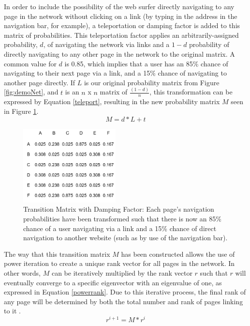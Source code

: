 \documentclass[12pt]{report}   %
\begin{document}
In order to include the possibility of the web surfer directly navigating to any page in the network without clicking on a link (by typing in the address in the navigation bar, for example), a teleportation or damping factor is added to this matrix of probabilities. This teleportation factor applies an arbitrarily-assigned probability, $d$, of navigating the network via links and a $1-d$ probability of directly navigating to any other page in the network to the original matrix. A common value for $d$ is 0.85, which implies that a user has an 85\% chance of navigating to their next page via a link, and a 15\% chance of navigating to another page directly. If $L$ is our original probability matrix from Figure \ref{fig:demoNet}, and $t$ is an $n$ x $n$ matrix of $\frac{(1-d)}{n}$, this transformation can be expressed by Equation \ref{teleport}, resulting in the new probability matrix $M$ seen in Figure \ref{fig:demoDamp}.
\begin{equation}
\label{teleport}
M=d*L+t
\end{equation}

\begin{figure}[h]
    \centering
    \begin{minipage}{0.9\textwidth}
	\captionsetup{font=scriptsize}
        \centering
        \includegraphics[width=0.45\textwidth]{Marbut_DemoWDamping.png} %
        \caption{Transition Matrix with Damping Factor: Each page's navigation probabilities have been transformed such that there is now an 85\% chance of a user navigating via a link and a 15\% chance of direct navigation to another website (such as by use of the navigation bar).}
	  \label{fig:demoDamp}
    \end{minipage}
 \end{figure}
\FloatBarrier 

The way that this transition matrix $M$ has been constructed allows the use of power iteration to create a unique rank vector for all pages in the network. In other words, $M$ can be iteratively multiplied by the rank vector $r$ such that $r$ will eventually converge to a specific eigenvector with an eigenvalue of one, as expressed in Equation \ref{powerrank}. Due to this iterative process, the final rank of any page will be determined by both the total number and rank of pages linking to it \cite{haveliwala_2002}.
\begin{equation}
\label{powerrank}
r^{i+1}=M*r^{i}
\end{equation}
\end{document}
